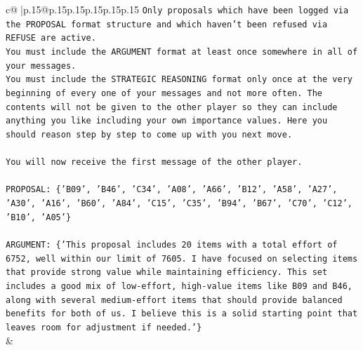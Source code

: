 \documentclass{article}
\begin{document}
{\begin{supertabular}{c@{$\;$}|p{.15\linewidth}@{}p{.15\linewidth}p{.15\linewidth}p{.15\linewidth}p{.15\linewidth}p{.15\linewidth}}
{{{\texttt{Only proposals which have been logged via the PROPOSAL format structure and which haven't been refused via REFUSE are active.} \\
\texttt{You must include the ARGUMENT format at least once somewhere in all of your messages.} \\
\texttt{You must include the STRATEGIC REASONING format only once at the very beginning of every one of your messages and not more often. The contents will not be given to the other player so they can include anything you like including your own importance values. Here you should reason step by step to come up with you next move.} \\
\\ 
\texttt{You will now receive the first message of the other player.} \\
\\ 
\texttt{PROPOSAL: \{'B09', 'B46', 'C34', 'A08', 'A66', 'B12', 'A58', 'A27', 'A30', 'A16', 'B60', 'A84', 'C15', 'C35', 'B94', 'B67', 'C70', 'C12', 'B10', 'A05'\}} \\
\\ 
\texttt{ARGUMENT: \{'This proposal includes 20 items with a total effort of 6752, well within our limit of 7605. I have focused on selecting items that provide strong value while maintaining efficiency. This set includes a good mix of low{-}effort, high{-}value items like B09 and B46, along with several medium{-}effort items that should provide balanced benefits for both of us. I believe this is a solid starting point that leaves room for adjustment if needed.'\}} \\
            }
        }
    }
    & \\ \\


\end{supertabular}}
\end{document}
